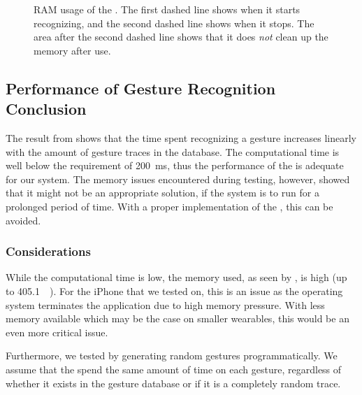 \begin{figure}[!htb]
  \caption{RAM usage of the \threedollar. The first dashed line shows when it starts recognizing, and the second dashed line shows when it stops. The area after the second dashed line shows that it does \emph{not} clean up the memory after use.}
  \label{fig:threedollarmemory}
\end{figure}

\subsection{Performance of Gesture Recognition Conclusion}
The result from  shows that the time spent recognizing a gesture 
increases linearly with the amount of gesture traces in the database.
The computational time is well below the requirement of \SI{200}{\milli\second},
thus the performance of the \threedollar is adequate for our system. 
The memory issues encountered during testing, however, 
showed that it might not be an appropriate solution, 
if the system is to run for a prolonged period of time.
With a proper implementation of the \threedollar, 
this can be avoided. 

\subsubsection{Considerations}
While the computational time is low, 
the memory used, as seen by , is high (up to \SI{405.1}{\mega\byte}). 
For the iPhone that we tested on, this is an issue as the operating system terminates the application due to high memory pressure. With less memory available which may be the case on smaller wearables, this would be an even more critical issue.

Furthermore, we tested by generating random gestures programmatically. 
We assume that the \threedollar spend the same amount of time on each gesture, 
regardless of whether it exists in the gesture database or if it is a completely random trace. 

